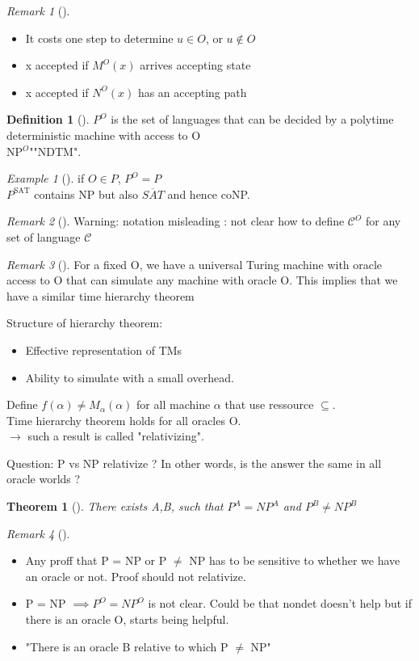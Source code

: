 \documentclass{article}
\newtheorem{theorem}{Theorem}
\theoremstyle{definition}
\newtheorem{definition}{Definition}
\theoremstyle{remark}
\newtheorem*{remark}{Remark}
\newtheorem*{example}{Example}
\newcommand{\Thm}[3]{\begin{theorem}[#1]\label{#2}#3\end{theorem}}
\newcommand{\Ex}[3]{\begin{example}[#1]\label{#2}#3\end{example}}
\newcommand{\Def}[3]{\begin{definition}[#1]\label{#2}#3\end{definition}}
\newcommand{\Rem}[3]{\begin{remark}[#1]\label{#2}#3\end{remark}}
\begin{document}
\Rem{}{}{\begin{itemize}
		\item It costs one step to determine $u \in O$, or $u \notin O$
		\item x accepted if $M^O(x)$ arrives accepting state
		\item x accepted if $N^O(x)$ has an accepting path
	\end{itemize}}
	
\Def{}{}{$P^O$ is the set of languages that can be decided by a polytime deterministic machine with access to O\\
	NP$^O$\indent"\indent"\indent NDTM\indent".}

\Ex{}{}{if $O \in P$, $P^O = P$\\
	$P^{\text{SAT}}$ contains NP but also $\overline{SAT}$ and hence coNP.
}
\Rem{}{}{Warning: notation misleading : not clear how to define $\mathcal{C}^O$ for any set of language $\mathcal{C}$}

\Rem{}{}{For a fixed O, we have a universal Turing machine with oracle access to O that can simulate any machine with oracle O. This implies that we have a similar time hierarchy theorem}

Structure of hierarchy theorem:\begin{itemize}
	\item Effective representation of TMs
	\item Ability to simulate with a small overhead.
\end{itemize}
Define $f(\alpha) \neq M_\alpha(\alpha)$ for all machine $\alpha$ that use ressource $\subseteq$.\\

Time hierarchy theorem holds for all oracles O.\\
$\rightarrow$ such a result is called "relativizing".

Question: P vs NP relativize ?
In other words, is the answer the same in all oracle worlds ?

\Thm{}{}{There exists A,B, such that $P^A = NP^A$ and $P^B \neq NP^B$}

\Rem{}{}{\begin{itemize}
		\item Any proff that P = NP or P $\neq$ NP has to be sensitive to whether we have an oracle or not. Proof should not relativize.
		\item P = NP $\implies P^O = NP^O$ is not clear. Could be that nondet doesn't help but if there is an oracle O, starts being helpful.
		\item "There is an oracle B relative to which P $\neq$ NP"
	\end{itemize}}
\end{document}
